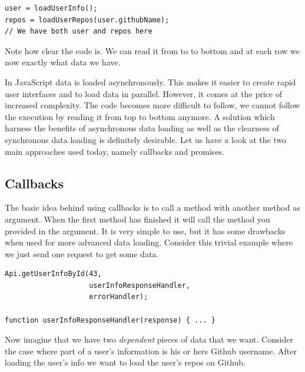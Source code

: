 \documentclass[a4paper,12pt]{article}
\begin{document}
\begin{lstlisting}[caption={Code showing how data loading might look like when done synchronously}, frame=single]
user = loadUserInfo();
repos = loadUserRepos(user.githubName);
// We have both user and repos here
\end{lstlisting}
Note how clear the code is. We can read it from to to bottom and at each row we now exactly what data we have.

In JavaScript data is loaded asynchronously. This makes it easier to create rapid user interfaces and to load data in parallel. However, it comes at the price of increased complexity.
The code becomes more difficult to follow, we cannot follow the execution by reading it from top to bottom anymore.
A solution which harness the benefits of asynchronous data loading as well as the clearness of synchronous data loading is definitely desirable.
Let us have a look at the two main approaches used today, namely callbacks and promises.

\subsection{Callbacks}
The basic idea behind using callbacks is to call a method with another method as argument. When the first method has finished it will call the method you provided in the argument.
It is very simple to use, but it has some drawbacks when used for more advanced data loading. Consider this trivial example where we just send one request to get some data.

\begin{lstlisting}[caption=Code showing how we can load data using callbacks, frame=single]
Api.getUserInfoById(43, 
                    userInfoResponseHandler, 
                    errorHandler);

function userInfoResponseHandler(response) { ... }
\end{lstlisting}
Now imagine that we have two \emph{dependent} pieces of data that we want. Consider the case where part of a user's information is
his or hers Github username. After loading the user's info we want to load the user's repos on Github.
\end{document}
